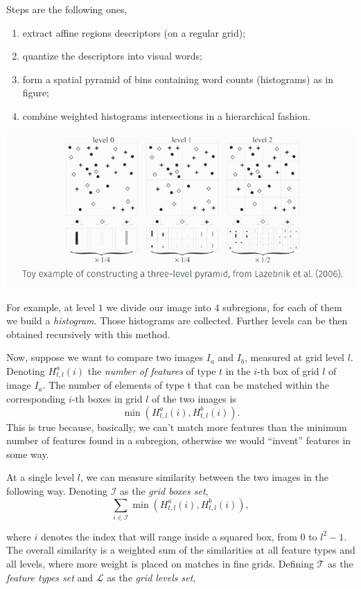 \documentclass[10pt]{report}
\begin{document}
Steps are the following ones,

\begin{enumerate}
\item extract affine regions descriptors (on a regular grid);
\item quantize the descriptors into visual words;
\item form a spatial pyramid of bins containing word counts (histograms) as
in figure;
\item combine weighted histograms intersections in a hierarchical fashion.
\end{enumerate}

\begin{center}
\includegraphics[scale=0.5]{./pics/recog/spatial-pyramid-procedure.jpg}
\end{center}

For example, at level
\(1\) we divide our image into \(4\) subregions, for each of them we
build a \emph{histogram}. Those histograms are collected. Further levels can
be then obtained recursively with this method.

Now, suppose we want to compare two images \(I_a\) and \(I_b\), measured
at grid level \(l\). Denoting \(H^a_{t,l}(i)\) the \emph{number of features}
of type \(t\) in the \(i\mbox{-th}\) box of grid \(l\) of image \(I_a\).
The number of elements of type t that can be matched within the
corresponding \(i\mbox{-th}\) boxes in grid \(l\) of the two images is
\[\min{(H^a_{t,l}(i), H^b_{t,l}(i))}.\] This is true because, basically,
we can't match more features than the minimum number of features found
in a subregion, otherwise we would ``invent'' features in some way.

At a single level \(l\), we can measure similarity between the two
images in the following way. Denoting \(\mathcal{I}\) as the \emph{grid boxes
set}, \[ \sum_{i \in \mathcal{I}} \min{(H^a_{t,l}(i), H^b_{t,l}(i))},\]

where \(i\) denotes the index that will range inside a squared box, from
\(0\) to \(l^2 - 1\). The overall similarity is a weighted sum of the
similarities at all feature types and all levels, where more weight is
placed on matches in fine grids. Defining \(\mathcal{T}\) as the
\emph{feature types set} and \(\mathcal{L}\) as the \emph{grid levels set},
\end{document}

